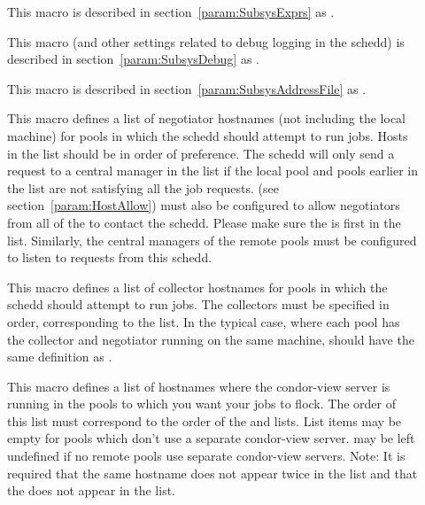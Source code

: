 \begin{description}
\item[] \label{param:ScheddExprs} This macro is
  described in section~\ref{param:SubsysExprs} as
  .

\item[] \label{param:ScheddDebug} This macro
  (and other settings related to debug logging in the schedd) is
  described in section~\ref{param:SubsysDebug} as
  .

\item[] \label{param:ScheddAddressFile}
  This macro is described in
  section~\ref{param:SubsysAddressFile} as
  . 

\item[] \label{param:FlockNegotiatorHosts} 
  This macro defines a list of negotiator hostnames (not including the
  local  machine) for pools in which the
  schedd should attempt to run jobs.  Hosts in the list should be in
  order of preference.  The schedd will only send a request to a
  central manager in the list if the local pool and pools earlier in
  the list are not satisfying all the job requests.
   (see
  section~\ref{param:HostAllow}) must also be configured to allow
  negotiators from all of the  to
  contact the schedd.  Please make sure the
   is first in the
   list.  Similarly, the
  central managers of the remote pools must be configured to listen to
  requests from this schedd.

\item[] \label{param:FLockCollectorHosts}
  This macro defines a list of collector hostnames for pools in which
  the schedd should attempt to run jobs.  The
  collectors must be specified in order, corresponding to the
   list.  In the typical case, where each pool
  has the collector and negotiator running on the same machine,
   should have the same definition as
  .

\item[] \label{param:FlockViewServers}
  This macro defines a list of hostnames where the condor-view server
  is running in the pools to which you want your jobs to flock.  The
  order of this list must correspond to the order of the
   and
   lists.  List items may be empty
  for pools which don't use a separate condor-view server.
   may be left undefined if no remote
  pools use separate condor-view servers.  Note: It is required that
  the same hostname does not appear twice in the
   list and that the
   does not appear in the
   list.


\end{description}
